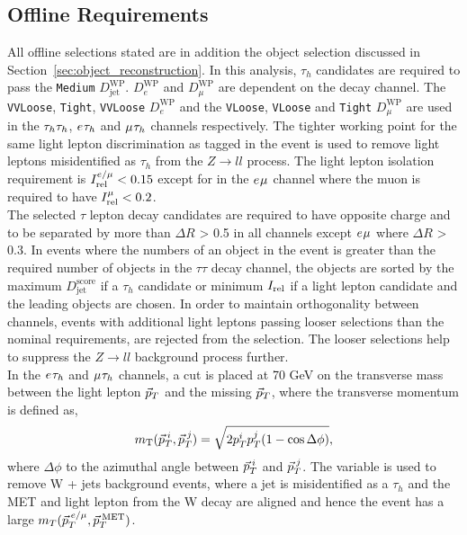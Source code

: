 \subsection{Offline Requirements}

All offline selections stated are in addition the object selection discussed in Section~\ref{sec:object_reconstruction}.
In this analysis, $\tau_h$ candidates are required to pass the \texttt{Medium} $D_{\text{jet}}^{\text{WP}}$.
$D_{e}^{\text{WP}}$ and $D_{\mu}^{\text{WP}}$ are dependent on the decay channel.
The \texttt{VVLoose}, \texttt{Tight}, \texttt{VVLoose} $D_{e}^{\text{WP}}$ and the \texttt{VLoose}, \texttt{VLoose} and \texttt{Tight} $D_{\mu}^{\text{WP}}$ are used in the $\tau_{h}\tau_{h}$, $e_{}\tau_{h}$ and $\mu_{}\tau_{h}$ channels respectively.
The tighter working point for the same light lepton discrimination as tagged in the event is used to remove light leptons misidentified as $\tau_h$ from the $Z \rightarrow ll$ process.
The light lepton isolation requirement is $I_{\text{rel}}^{e/\mu} < 0.15$ except for in the $e_{}\mu_{}$ channel where the muon is required to have $I_{\text{rel}}^{\mu} < 0.2$. \\

The selected $\tau$ lepton decay candidates are required to have opposite charge and to be separated by more than $\Delta R$ > 0.5 in all channels except $e_{}\mu_{}$ where $\Delta R$ > 0.3.
In events where the numbers of an object in the event is greater than the required number of objects in the $\tau\tau$ decay channel, the objects are sorted by the maximum $D_{\text{jet}}^{\text{score}}$ if a $\tau_h$ candidate or minimum $I_{\text{rel}}$ if a light lepton candidate and the leading objects are chosen.
In order to maintain orthogonality between channels, events with additional light leptons passing looser selections than the nominal requirements, are rejected from the selection.
The looser selections help to suppress the $Z \rightarrow ll$ background process further. \\

In the $e_{}\tau_{h}$ and $\mu_{}\tau_{h}$ channels, a cut is placed at 70 GeV on the transverse mass between the light lepton $\vec{p}_{T}$ and the missing $\vec{p}_{T}$, where the transverse momentum is defined as,
\begin{equation}
m_{\text{T}}(\vec{p}_{T}^{\hspace{2pt}i},\vec{p}_{T}^{\hspace{2pt}j}) = \sqrt{2p_{T}^{i}p_{T}^{j}(1-\cos\Delta\phi)},
\label{eqn:mt}
\end{equation}
where $\Delta\phi$ to the azimuthal angle between $\vec{p}_{T}^{\hspace{2pt}i}$ and $\vec{p}_{T}^{\hspace{2pt}j}$.
The variable is used to remove W + jets background events, where a jet is misidentified as a $\tau_h$ and the MET and light lepton from the W decay are aligned and hence the event has a large $m_{T}(\vec{p}_{T}^{\hspace{2pt}e/\mu},\vec{p}_{T}^{\hspace{2pt}\text{MET}})$. \\

